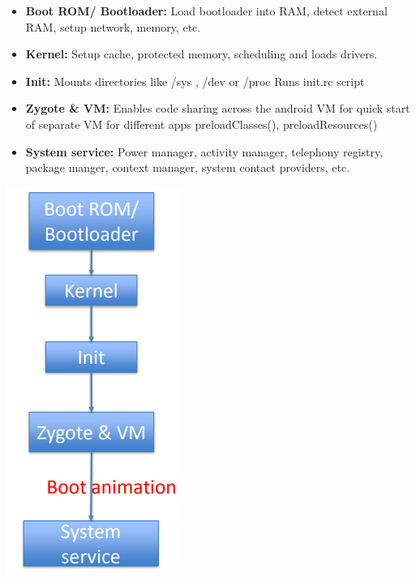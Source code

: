 \documentclass{article}
\begin{document}
\begin{multicols}{2}
  \begin{itemize}
		\item \textbf{Boot ROM/ Bootloader:} Load bootloader into RAM, detect external RAM, setup network, memory, etc.
		\item \textbf{Kernel:} Setup cache, protected memory, scheduling and loads drivers.
		\item \textbf{Init:} Mounts directories like /sys , /dev or /proc Runs init.rc script
		\item \textbf{Zygote \& VM:} Enables code sharing across the android VM for quick start of separate VM for different apps preloadClasses(), preloadResources()
		\item \textbf{System service:} Power manager, activity manager, telephony registry, package manger, context manager, system contact providers, etc.
	\end{itemize}
	\vfill\null

	\begin{center}
	  \includegraphics[scale=0.5]{boot_process.png}
	\end{center}
\end{multicols}
\end{document}
